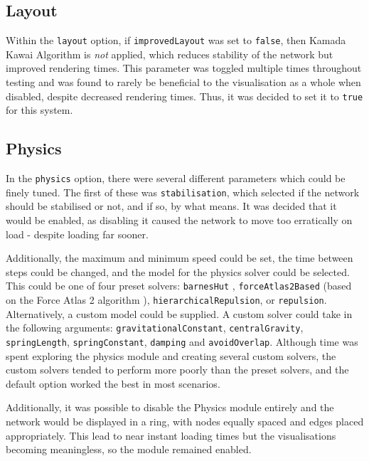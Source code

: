 \documentclass[../dissertation.tex]{subfiles}
\begin{document}
\subsection{Layout}

Within the \texttt{layout} \cite{visjslayout} option, if \texttt{improvedLayout} was set to \texttt{false}, then Kamada Kawai Algorithm \cite{kamada1989algorithm} is \emph{not} applied, which reduces stability of the network but improved rendering times. This parameter was toggled multiple times throughout testing and was found to rarely be beneficial to the visualisation as a whole when disabled, despite decreased rendering times. Thus, it was decided to set it to \texttt{true} for this system.

\subsection{Physics}

In the \texttt{physics} \cite{visjsphysics} option, there were several different parameters which could be finely tuned. The first of these was \texttt{stabilisation}, which selected if the network should be stabilised or not, and if so, by what means. It was decided that it would be enabled, as disabling it caused the network to move too erratically on load - despite loading far sooner. 

Additionally, the maximum and minimum speed could be set, the time between steps could be changed, and the model for the physics solver could be selected. This could be one of four preset solvers: \texttt{barnesHut} \cite{barnes1986hierarchical}, \texttt{forceAtlas2Based} (based on the Force Atlas 2 algorithm \cite{jacomy2014forceatlas2}), \texttt{hierarchicalRepulsion}, or \texttt{repulsion}. Alternatively, a custom model could be supplied. A custom solver could take in the following arguments: \texttt{gravitationalConstant}, \texttt{centralGravity}, \texttt{springLength}, \texttt{springConstant}, \texttt{damping} and \texttt{avoidOverlap}. Although time was spent exploring the physics module and creating several custom solvers, the custom solvers tended to perform more poorly than the preset solvers, and the default option worked the best in most scenarios. 

Additionally, it was possible to disable the Physics module entirely and the network would be displayed in a ring, with nodes equally spaced and edges placed appropriately. This lead to near instant loading times but the visualisations becoming meaningless, so the module remained enabled.
\end{document}
